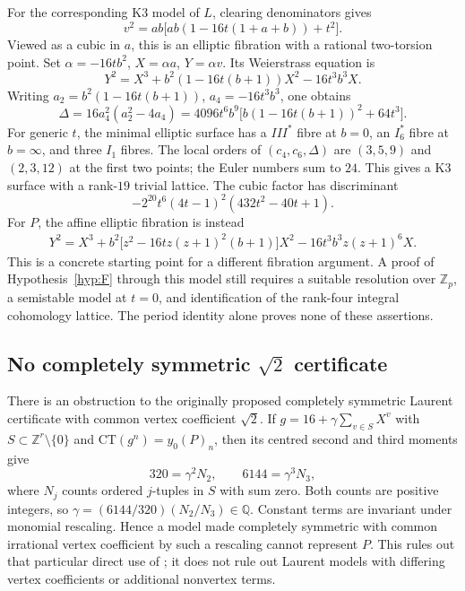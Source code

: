 \documentclass[11pt]{amsart}
\theoremstyle{definition}
\theoremstyle{remark}
\newcommand{\Z}{\mathbb{Z}}
\newcommand{\Q}{\mathbb{Q}}
\begin{document}
For the corresponding K3 model of $L$, clearing denominators gives
\[
v^2=ab\bigl[ab(1-16t(1+a+b))+t^2\bigr].
\]
Viewed as a cubic in $a$, this is an elliptic fibration with a rational two-torsion
point. Set $\alpha=-16t b^2$, $X=\alpha a$, $Y=\alpha v$. Its Weierstrass equation is
\begin{equation}\label{eq:K3-fibration}
Y^2=X^3+b^2(1-16t(b+1))X^2-16t^3b^3X.
\end{equation}
Writing $a_2=b^2(1-16t(b+1))$, $a_4=-16t^3b^3$, one obtains
\[
\Delta=16a_4^2(a_2^2-4a_4)
=4096t^6b^9\bigl[b(1-16t(b+1))^2+64t^3\bigr].
\]
For generic $t$, the minimal elliptic surface has a $III^*$ fibre at $b=0$,
an $I_6^*$ fibre at $b=\infty$, and three $I_1$ fibres. The local orders of
$(c_4,c_6,\Delta)$ are $(3,5,9)$ and $(2,3,12)$ at the first two points;
the Euler numbers sum to $24$. This gives a K3 surface with a rank-$19$ trivial
lattice. The cubic factor has discriminant
\[
-2^{20}t^6(4t-1)^2(432t^2-40t+1).
\]
For $P$, the affine elliptic fibration is instead
\begin{align*}
Y^2=X^3+b^2\bigl[z^2-16t z(z+1)^2(b+1)\bigr]X^2
-16t^3b^3z(z+1)^6X.
\end{align*}
This is a concrete starting point for a different fibration argument.
A proof of Hypothesis~\ref{hyp:F} through this model still requires a suitable
resolution over $\Z_p$, a semistable model at $t=0$, and identification of the
rank-four integral cohomology lattice. The period identity alone proves none
of these assertions.

\subsection{No completely symmetric $\sqrt2$ certificate}

There is an obstruction to the originally proposed completely symmetric
Laurent certificate with common vertex coefficient $\sqrt2$. If
$g=16+\gamma\sum_{v\in S}X^v$ with $S\subset\Z^r\setminus\{0\}$ and
$\mathrm{CT}(g^n)=y_0(P)_n$, then its centred second and third moments give
\[
320=\gamma^2 N_2,\qquad6144=\gamma^3N_3,
\]
where $N_j$ counts ordered $j$-tuples in $S$ with sum zero. Both counts are
positive integers, so $\gamma=(6144/320)(N_2/N_3)\in\Q$.
Constant terms are invariant under monomial rescaling. Hence a model made
completely symmetric with common irrational vertex coefficient by such a
rescaling cannot represent $P$. This rules out that particular direct use of
\cite[Prop.~7.7]{BV3}; it does not rule out Laurent models with differing
vertex coefficients or additional nonvertex terms.
\end{document}
